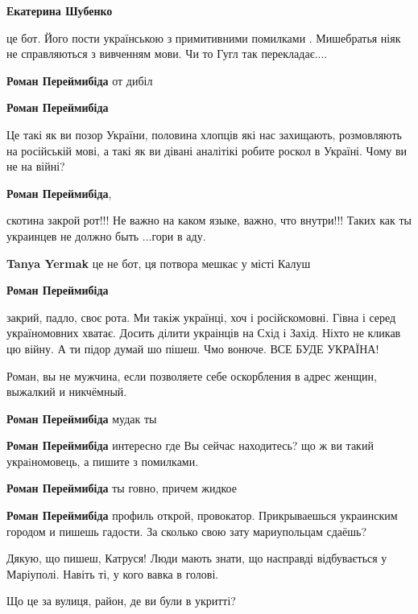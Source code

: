 \begin{itemize}
\textbf{Екатерина Шубенко} 

це бот. Його пости українською з примитивними помилками . Мишебратья ніяк не
справляються з вивченням мови. Чи то Гугл так перекладає....

\textbf{Роман Переймибіда} от дибіл

\textbf{Роман Переймибіда} 

Це такі як ви позор України, половина хлопців які нас захищають, розмовляють на
російській мові, а такі як ви дівані аналітікі робите роскол в Україні. Чому ви
не на війні?

\textbf{Роман Переймибіда}, 

скотина закрой рот!!! Не важно на каком языке, важно, что внутри!!! Таких как
ты украинцев не должно быть ...гори в аду.

\textbf{Tanya Yermak} це не бот, ця потвора мешкає у місті Калуш

\textbf{Роман Переймибіда} 

закрий, падло, своє рота. Ми такіж українці, хоч і російскомовні. Гівна і серед
україномовних хватає. Досить ділити украінців на Схід і Захід. Ніхто не кликав
цю війну. А ти підор думай шо пішеш. Чмо вонюче. ВСЕ БУДЕ УКРАЇНА!


Роман, вы не мужчина, если позволяете себе оскорбления в адрес женщин, выжалкий и никчёмный.

\textbf{Роман Переймибіда} мудак ты

\textbf{Роман Переймибіда} интересно где Вы сейчас находитесь? що ж ви такий украiномовець, а пишите з помилками.

\textbf{Роман Переймибіда} ты говно, причем жидкое

\textbf{Роман Переймибіда} профиль открой, провокатор. Прикрываешься украинским городом и пишешь гадости. За сколько свою зату мариупольцам сдаёшь?

\end{itemize} %


Дякую, що пишеш, Катруся! Люди мають знати, що насправді відбувається у
Маріуполі. Навіть ті, у кого вавка в голові.

Що це за вулиця, район, де ви були в укритті?

